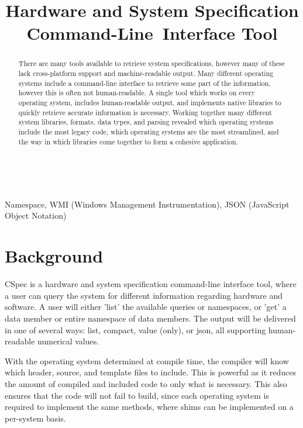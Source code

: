 \documentclass[conference]{IEEEtran}
\begin{document}
\title{Hardware and System Specification Command-Line~Interface Tool}
\author{
}
\maketitle

\begin{abstract}
There are many tools available to retrieve system specifications, however many of these lack cross-platform support and machine-readable output.
Many different operating systems include a command-line interface to retrieve some part of the information, however this is often not human-readable.
A single tool which works on every operating system, includes human-readable output, and implements native libraries to quickly retrieve accurate information is necessary.
Working together many different system libraries, formats, data types, and parsing revealed which operating systems include the most legacy code, which operating systems are the most streamlined, and the way in which libraries come together to form a cohesive application.
\end{abstract}
~\\
\begin{IEEEkeywords}
Namespace, WMI (Windows Management Instrumentation), JSON (JavaScript Object Notation)
\end{IEEEkeywords}

\section{Background}
CSpec is a hardware and system specification command-line interface tool, where a user can query
the system for different information regarding hardware and software.
A user will either 'list' the available queries or namespaces, or 'get' a data member or entire namespace of data members.
The output will be delivered in one of several ways: list, compact, value (only), or json, all supporting human-readable numerical values.

With the operating system determined at compile time, the compiler will know which header, source, and template files to include.
This is powerful as it reduces the amount of compiled and included code to only what is necessary.
This also ensures that the code will not fail to build, since each operating system is required to implement the same methods,
where shims can be implemented on a per-system basis.
\end{document}
